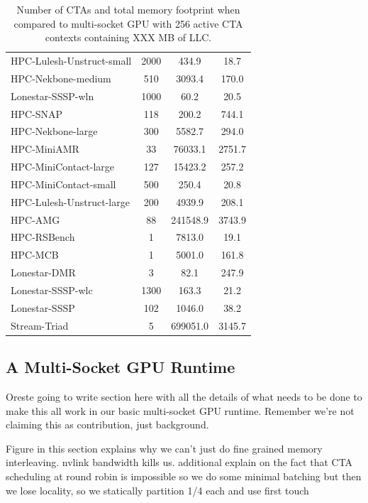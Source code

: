 \begin{table}[tp]
\begin{small}
\begin{tabular}{lccc}
HPC-Lulesh-Unstruct-small & 2000 & 434.9 & 18.7 \\
HPC-Nekbone-medium & 510 & 3093.4 & 170.0 \\
Lonestar-SSSP-wln & 1000 & 60.2 & 20.5 \\
HPC-SNAP & 118 & 200.2 & 744.1 \\
HPC-Nekbone-large & 300 & 5582.7 & 294.0 \\
HPC-MiniAMR & 33 & 76033.1 & 2751.7 \\
HPC-MiniContact-large & 127 & 15423.2 & 257.2 \\
HPC-MiniContact-small & 500 & 250.4 & 20.8 \\
HPC-Lulesh-Unstruct-large & 200 & 4939.9 & 208.1 \\
HPC-AMG & 88 & 241548.9 & 3743.9 \\
HPC-RSBench & 1 & 7813.0 & 19.1 \\
HPC-MCB & 1 & 5001.0 & 161.8 \\
Lonestar-DMR & 3 & 82.1 & 247.9 \\
Lonestar-SSSP-wlc & 1300 & 163.3 & 21.2 \\
Lonestar-SSSP & 102 & 1046.0 & 38.2 \\
Stream-Triad & 5 & 699051.0 & 3145.7 \\
\toprule
\end{tabular}
\caption{Number of CTAs and total memory footprint when compared to multi-socket GPU with 256 active CTA contexts containing XXX MB of LLC.}
\label{tab:numctas}
\end{small}
\end{table}



\subsection{A Multi-Socket GPU Runtime}

Oreste going to write section here with all the details of what needs to be done
to make this all work in our basic multi-socket GPU runtime.  Remember we're not
claiming this as contribution, just background.

Figure in this section explains why we can't just do fine grained memory interleaving.
nvlink bandwidth kills us.  additional explain on the fact that CTA scheduling at round robin
is impossible so we do some minimal batching but then we lose locality, so we statically
partition 1/4 each and use first touch



